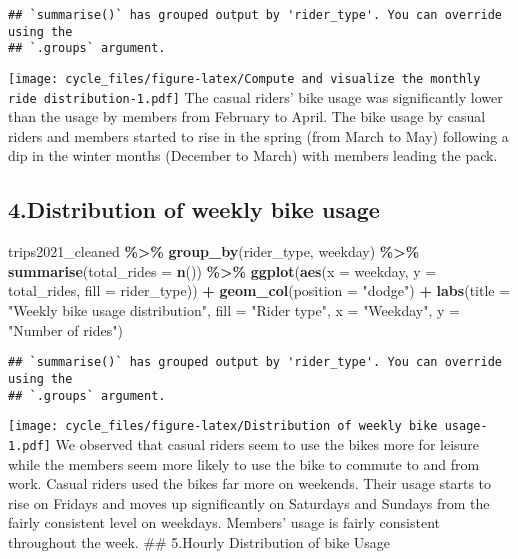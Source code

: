 \documentclass[
]{article}
\newenvironment{Shaded}{\begin{snugshade}}{\end{snugshade}}
\newcommand{\AttributeTok}[1]{\textcolor[rgb]{0.13,0.29,0.53}{#1}}
\newcommand{\FunctionTok}[1]{\textcolor[rgb]{0.13,0.29,0.53}{\textbf{#1}}}
\newcommand{\NormalTok}[1]{#1}
\newcommand{\SpecialCharTok}[1]{\textcolor[rgb]{0.81,0.36,0.00}{\textbf{#1}}}
\newcommand{\StringTok}[1]{\textcolor[rgb]{0.31,0.60,0.02}{#1}}
\begin{document}
\begin{verbatim}
## `summarise()` has grouped output by 'rider_type'. You can override using the
## `.groups` argument.
\end{verbatim}

\texttt{[image: cycle\_files/figure-latex/Compute and visualize the monthly ride distribution-1.pdf]}
The casual riders' bike usage was significantly lower than the usage by
members from February to April. The bike usage by casual riders and
members started to rise in the spring (from March to May) following a
dip in the winter months (December to March) with members leading the
pack.

\hypertarget{distribution-of-weekly-bike-usage}{%
\subsection{4.Distribution of weekly bike
usage}\label{distribution-of-weekly-bike-usage}}

\begin{Shaded}
\begin{Highlighting}[]
\NormalTok{trips2021\_cleaned }\SpecialCharTok{\%\textgreater{}\%} 
  \FunctionTok{group\_by}\NormalTok{(rider\_type, weekday) }\SpecialCharTok{\%\textgreater{}\%} 
  \FunctionTok{summarise}\NormalTok{(}\AttributeTok{total\_rides =} \FunctionTok{n}\NormalTok{()) }\SpecialCharTok{\%\textgreater{}\%} 
  \FunctionTok{ggplot}\NormalTok{(}\FunctionTok{aes}\NormalTok{(}\AttributeTok{x =}\NormalTok{ weekday, }\AttributeTok{y =}\NormalTok{ total\_rides, }\AttributeTok{fill =}\NormalTok{ rider\_type)) }\SpecialCharTok{+}
  \FunctionTok{geom\_col}\NormalTok{(}\AttributeTok{position =} \StringTok{"dodge"}\NormalTok{) }\SpecialCharTok{+}
  \FunctionTok{labs}\NormalTok{(}\AttributeTok{title =} \StringTok{"Weekly bike usage distribution"}\NormalTok{, }
       \AttributeTok{fill =} \StringTok{"Rider type"}\NormalTok{, }\AttributeTok{x =} \StringTok{"Weekday"}\NormalTok{,}
       \AttributeTok{y =} \StringTok{"Number of rides"}\NormalTok{)}
\end{Highlighting}
\end{Shaded}

\begin{verbatim}
## `summarise()` has grouped output by 'rider_type'. You can override using the
## `.groups` argument.
\end{verbatim}

\texttt{[image: cycle\_files/figure-latex/Distribution of weekly bike usage-1.pdf]}
We observed that casual riders seem to use the bikes more for leisure
while the members seem more likely to use the bike to commute to and
from work. Casual riders used the bikes far more on weekends. Their
usage starts to rise on Fridays and moves up significantly on Saturdays
and Sundays from the fairly consistent level on weekdays. Members' usage
is fairly consistent throughout the week. \#\# 5.Hourly Distribution of
bike Usage
\end{document}
